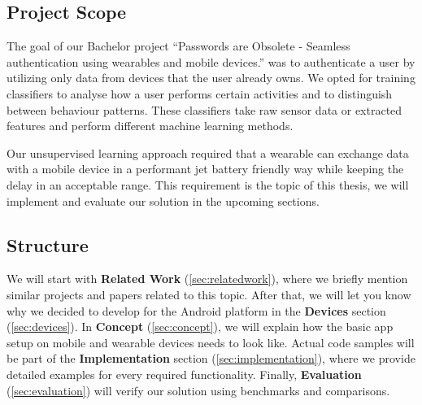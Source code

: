 \subsection{Project Scope}
\label{sec:intro:scope}
The goal of our Bachelor project ``Passwords are Obsolete - Seamless authentication using wearables and mobile devices.'' was to authenticate a user by utilizing only data from devices that the user already owns.
We opted for training classifiers to analyse how a user performs certain activities and to distinguish between behaviour patterns. These classifiers take raw sensor data or extracted features and perform different machine learning methods.

Our unsupervised learning approach required that a wearable can exchange data with a mobile device in a performant jet battery friendly way while keeping the delay in an acceptable range.
This requirement is the topic of this thesis, we will implement and evaluate our solution in the upcoming sections.

\subsection{Structure}
\label{sec:intro:structure}

We will start with \textbf{Related Work} (\ref{sec:relatedwork}), where we briefly mention similar projects and papers related to this topic.
After that, we will let you know why we decided to develop for the Android platform in the \textbf{Devices} section (\ref{sec:devices}).
In \textbf{Concept} (\ref{sec:concept}), we will explain how the basic app setup on mobile and wearable devices needs to look like.
Actual code samples will be part of the \textbf{Implementation} section (\ref{sec:implementation}), where we provide detailed examples for every required functionality.
Finally, \textbf{Evaluation} (\ref{sec:evaluation}) will verify our solution using benchmarks and comparisons.

\clearpage